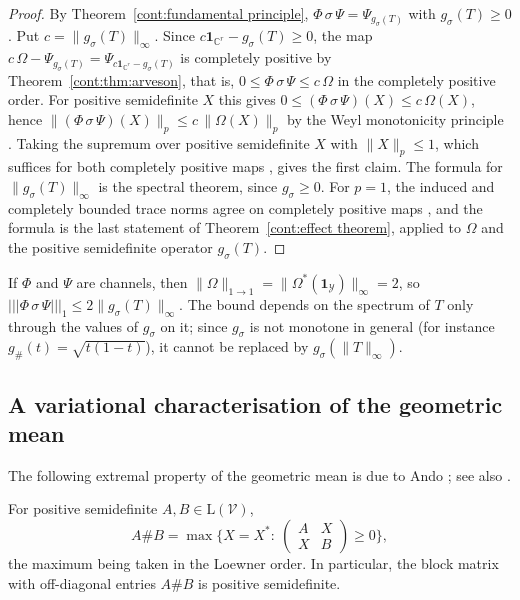 \begin{proof}
By Theorem~\ref{cont:fundamental principle}, $\Phi\,\sigma\,\Psi=\Psi_{g_\sigma(T)}$ with $g_\sigma(T)\geq0$. Put $c=\|g_\sigma(T)\|_\infty$. Since $c\mathbf{1}_{\mathbb{C}^r}-g_\sigma(T)\geq0$, the map $c\,\Omega-\Psi_{g_\sigma(T)}=\Psi_{c\mathbf{1}_{\mathbb{C}^r}-g_\sigma(T)}$ is completely positive by Theorem~\ref{cont:thm:arveson}, that is, $0\leq\Phi\,\sigma\,\Psi\leq c\,\Omega$ in the completely positive order. For positive semidefinite $X$ this gives $0\leq(\Phi\,\sigma\,\Psi)(X)\leq c\,\Omega(X)$, hence $\|(\Phi\,\sigma\,\Psi)(X)\|_p\leq c\,\|\Omega(X)\|_p$ by the Weyl monotonicity principle \cite[Section~III.2]{bhatia1997matrix}. Taking the supremum over positive semidefinite $X$ with $\|X\|_p\leq1$, which suffices for both completely positive maps \cite{Watrous2005notes}, gives the first claim. The formula for $\|g_\sigma(T)\|_\infty$ is the spectral theorem, since $g_\sigma\geq0$. For $p=1$, the induced and completely bounded trace norms agree on completely positive maps \cite[Section~3.3.2]{watrous2018theory}, and the formula is the last statement of Theorem~\ref{cont:effect theorem}, applied to $\Omega$ and the positive semidefinite operator $g_\sigma(T)$.
\end{proof}
 
\begin{remark}
If $\Phi$ and $\Psi$ are channels, then $\|\Omega\|_{1\to1}=\|\Omega^*(\mathbf{1}_{\mathcal{Y}})\|_\infty=2$, so $|||\Phi\,\sigma\,\Psi|||_1\leq2\|g_\sigma(T)\|_\infty$. The bound depends on the spectrum of $T$ only through the values of $g_\sigma$ on it; since $g_\sigma$ is not monotone in general (for instance $g_\#(t)=\sqrt{t(1-t)}$), it cannot be replaced by $g_\sigma(\|T\|_\infty)$.
\end{remark}
 
\subsection{A variational characterisation of the geometric mean}
 
The following extremal property of the geometric mean is due to Ando \cite{Ando1979}; see also \cite[Chapter~4]{Bhatia2007positive}.
 
\begin{lemma}\label{cont:app:ando max}
For positive semidefinite $A,B\in\mathrm{L}(\mathcal{V})$,
\[
A\#B=\max\Big\{X=X^*:\ \begin{pmatrix}A&X\\X&B\end{pmatrix}\geq0\Big\},
\]
the maximum being taken in the Loewner order. In particular, the block matrix with off-diagonal entries $A\#B$ is positive semidefinite.
\end{lemma}
 
